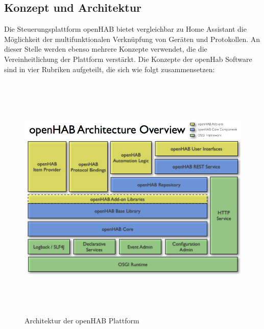 \subsection{Konzept und Architektur}
    Die Steuerungsplattform openHAB bietet vergleichbar zu Home Assistant die Möglichkeit der multifunktionalen Verknüpfung von 
    Geräten und Protokollen. An dieser Stelle werden ebenso mehrere Konzepte verwendet, die die Vereinheitlichung der Plattform 
    verstärkt. Die Konzepte der openHab Software sind in vier Rubriken aufgeteilt, die sich wie folgt zusammensetzen:
    \begin{figure}[hbt!]
        \centering
        \includegraphics[width=12cm,height=12cm,keepaspectratio]{images/openhab-architecture.png}
        \caption{Architektur der openHAB Plattform \cite{openHAB-architecture2018}}
        \label{fig:architectureopenHAB}
    \end{figure}


